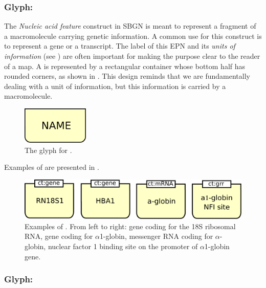 \subsubsection{Glyph: }
\label{sec:genetic}

The \emph{Nucleic acid feature} construct in SBGN is meant to represent a fragment of a macromolecule carrying genetic information.  A common use for this construct is to represent a gene or a transcript.  The label of this EPN and its \emph{units of information} (see ) are often important for making the purpose clear to the reader of a map. A  is represented by a rectangular container whose bottom half has rounded corners, as shown in . This design reminds that we are fundamentally dealing with a unit of information, but this information is carried by a macromolecule.

\begin{figure}[H]
  \centering
  \includegraphics[width = 1.25in]{le_images/genetic}
  \caption{The \PD glyph for .} 
  \label{fig:genetic}
\end{figure}

Examples of  are presented in .

\begin{figure}[H]
  \centering
  \includegraphics[scale = 0.5]{le_images/NucAcidFeat-examples}
  \caption{Examples of . From left to right: gene coding for the 18S ribosomal RNA, gene coding for $\alpha$1-globin, messenger RNA coding for $\alpha$-globin, nuclear factor 1 binding site on the promoter of $\alpha$1-globin gene.}
  \label{fig:NucAcidFeat-examples}
\end{figure}

\subsubsection{Glyph: }\label{sec:complex}

